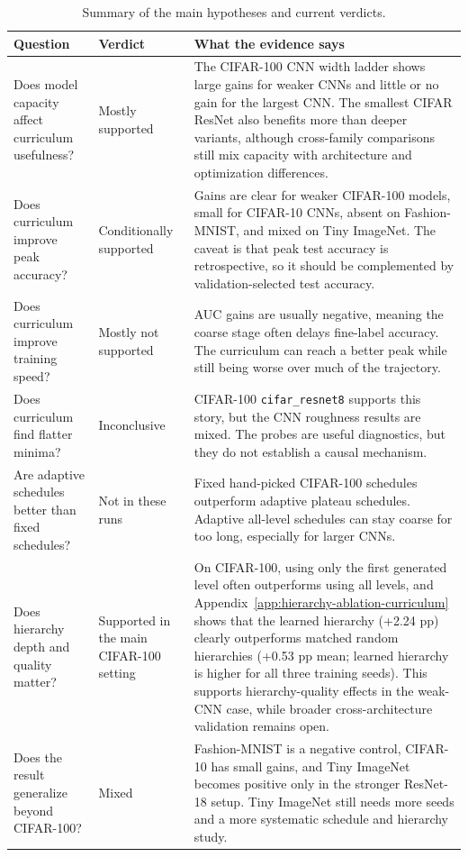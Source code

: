 \begin{table}[h]
\centering
\small
\setlength{\tabcolsep}{5pt}
\begin{tabular}{>{\raggedright\arraybackslash}p{}>{\raggedright\arraybackslash}p{}>{\raggedright\arraybackslash}p{}}
\hline
Question & Verdict & What the evidence says \\
\hline
Does model capacity affect curriculum usefulness? & Mostly supported & The CIFAR-100 CNN width ladder shows large gains for weaker CNNs and little or no gain for the largest CNN. The smallest CIFAR ResNet also benefits more than deeper variants, although cross-family comparisons still mix capacity with architecture and optimization differences. \\
Does curriculum improve peak accuracy? & Conditionally supported & Gains are clear for weaker CIFAR-100 models, small for CIFAR-10 CNNs, absent on Fashion-MNIST, and mixed on Tiny ImageNet. The caveat is that peak test accuracy is retrospective, so it should be complemented by validation-selected test accuracy. \\
Does curriculum improve training speed? & Mostly not supported & AUC gains are usually negative, meaning the coarse stage often delays fine-label accuracy. The curriculum can reach a better peak while still being worse over much of the trajectory. \\
Does curriculum find flatter minima? & Inconclusive & CIFAR-100 \texttt{cifar\_resnet8} supports this story, but the CNN roughness results are mixed. The probes are useful diagnostics, but they do not establish a causal mechanism. \\
Are adaptive schedules better than fixed schedules? & Not in these runs & Fixed hand-picked CIFAR-100 schedules outperform adaptive plateau schedules. Adaptive all-level schedules can stay coarse for too long, especially for larger CNNs. \\
Does hierarchy depth and quality matter? & Supported in the main CIFAR-100 setting & On CIFAR-100, using only the first generated level often outperforms using all levels, and Appendix~\ref{app:hierarchy-ablation-curriculum} shows that the learned hierarchy (+2.24 pp) clearly outperforms matched random hierarchies (+0.53 pp mean; learned hierarchy is higher for all three training seeds). This supports hierarchy-quality effects in the weak-CNN case, while broader cross-architecture validation remains open. \\
Does the result generalize beyond CIFAR-100? & Mixed & Fashion-MNIST is a negative control, CIFAR-10 has small gains, and Tiny ImageNet becomes positive only in the stronger ResNet-18 setup. Tiny ImageNet still needs more seeds and a more systematic schedule and hierarchy study. \\
\hline
\end{tabular}
\caption{Summary of the main hypotheses and current verdicts.}
\label{tab:appg-hypotheses-verdicts}
\end{table}
